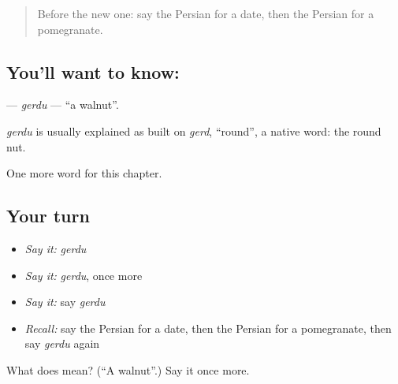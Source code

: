 \label{lesson:FA-C100-gerdu}



\begin{quote}
Before the new one: say the Persian for a date, then the Persian for a pomegranate.
\end{quote}

\subsection*{You'll want to know: }
\textbf{} — \emph{gerdu} — \textquotedblleft{}a walnut\textquotedblright{}.

\begin{cousinweb}
\emph{gerdu} is usually explained as built on \emph{gerd}, \textquotedblleft{}round\textquotedblright{}, a native word: the round nut.
\end{cousinweb}

\begin{grammarlens}[title={What you've built}]
One more word for this chapter.
\end{grammarlens}

\subsection*{Your turn}
\begin{itemize}
\raggedright
  \item \emph{Say it:} \emph{gerdu}
  \item \emph{Say it:} \emph{gerdu}, once more
  \item \emph{Say it:} say \emph{gerdu}
  \item \emph{Recall:} say the Persian for a date, then the Persian for a pomegranate, then say \emph{gerdu} again
\end{itemize}

\begin{tcolorbox}[breakable,colback=teal!4,colframe=teal!35!black,title={Before you move on}]
What does  mean? (\textquotedblleft{}A walnut\textquotedblright{}.) Say it once more.
\end{tcolorbox}
